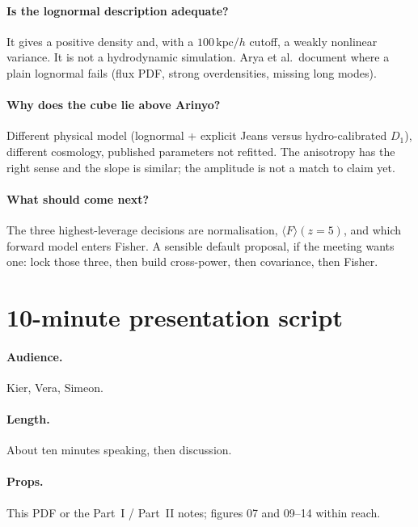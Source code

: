 \documentclass[11pt]{article}
\begin{document}
\paragraph{Is the lognormal description adequate?}
It gives a positive density and, with a $100\,\mathrm{kpc}/h$ cutoff, a weakly nonlinear variance.
It is not a hydrodynamic simulation.
Arya et al.\ document where a plain lognormal fails (flux PDF, strong overdensities, missing long modes).

\paragraph{Why does the cube lie above Arinyo?}
Different physical model (lognormal + explicit Jeans versus hydro-calibrated $D_1$), different cosmology, published parameters not refitted.
The anisotropy has the right sense and the slope is similar; the amplitude is not a match to claim yet.

\paragraph{What should come next?}
The three highest-leverage decisions are normalisation, $\langle F\rangle(z=5)$, and which forward model enters Fisher.
A sensible default proposal, if the meeting wants one: lock those three, then build cross-power, then covariance, then Fisher.

\section{10-minute presentation script}

\paragraph{Audience.} Kier, Vera, Simeon.
\paragraph{Length.} About ten minutes speaking, then discussion.
\paragraph{Props.} This PDF or the Part~I / Part~II notes; figures 07 and 09--14 within reach.
\end{document}
